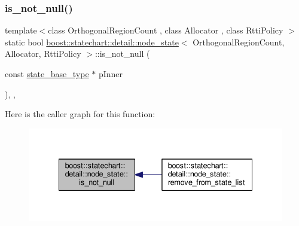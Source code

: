 \subsubsection{\texorpdfstring{is\+\_\+not\+\_\+null()}{is\_not\_null()}}
{\footnotesize\ttfamily template$<$class Orthogonal\+Region\+Count , class Allocator , class Rtti\+Policy $>$ \\
static bool \mbox{\hyperlink{classboost_1_1statechart_1_1detail_1_1node__state}{boost\+::statechart\+::detail\+::node\+\_\+state}}$<$ Orthogonal\+Region\+Count, Allocator, Rtti\+Policy $>$\+::is\+\_\+not\+\_\+null (\begin{DoxyParamCaption}\item[{const \mbox{\hyperlink{classboost_1_1statechart_1_1detail_1_1node__state__base_a2b7ddb7642a5452045d9448444426735}{state\+\_\+base\+\_\+type}} $\ast$}]{p\+Inner }\end{DoxyParamCaption})\hspace{0.3cm}{\ttfamily [inline]}, {\ttfamily [static]}, {\ttfamily [private]}}

Here is the caller graph for this function\+:
\nopagebreak
\begin{figure}[H]
\begin{center}
\leavevmode
\includegraphics[width=335pt]{classboost_1_1statechart_1_1detail_1_1node__state_a58441ed647eb2389e12c3bf341005047_icgraph}
\end{center}
\end{figure}
\mbox{\label{classboost_1_1statechart_1_1detail_1_1node__state_a1022b2fe0c4ea5f8b47d6fd1fb7e7ffb}} 
